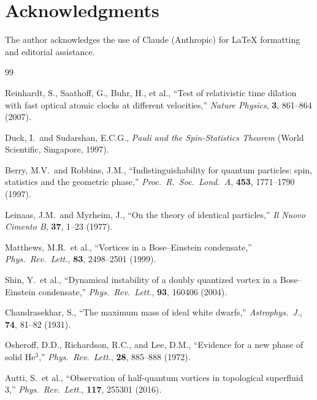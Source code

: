 ﻿\documentclass[12pt,letterpaper]{article}
\begin{document}

\section*{Acknowledgments}

The author acknowledges the use of Claude (Anthropic) for \LaTeX{} formatting
and editorial assistance.

\bigskip



\begin{thebibliography}{99}

Reinhardt, S., Saathoff, G., Buhr, H., et al.,
``Test of relativistic time dilation with fast optical atomic clocks at different velocities,''
\textit{Nature Physics}, \textbf{3}, 861--864 (2007).


Duck, I.\ and Sudarshan, E.C.G.,
\textit{Pauli and the Spin-Statistics Theorem}
(World Scientific, Singapore, 1997).


Berry, M.V.\ and Robbins, J.M.,
``Indistinguishability for quantum particles: spin, statistics and the geometric phase,''
\textit{Proc.\ R.\ Soc.\ Lond.\ A}, \textbf{453}, 1771--1790 (1997).


Leinaas, J.M.\ and Myrheim, J.,
``On the theory of identical particles,''
\textit{Il Nuovo Cimento B}, \textbf{37}, 1--23 (1977).


Matthews, M.R.\ et al.,
``Vortices in a Bose--Einstein condensate,''
\textit{Phys.\ Rev.\ Lett.}, \textbf{83}, 2498--2501 (1999).


Shin, Y.\ et al.,
``Dynamical instability of a doubly quantized vortex in a Bose--Einstein condensate,''
\textit{Phys.\ Rev.\ Lett.}, \textbf{93}, 160406 (2004).


Chandrasekhar, S.,
``The maximum mass of ideal white dwarfs,''
\textit{Astrophys.\ J.}, \textbf{74}, 81--82 (1931).


Osheroff, D.D., Richardson, R.C., and Lee, D.M.,
``Evidence for a new phase of solid He$^3$,''
\textit{Phys.\ Rev.\ Lett.}, \textbf{28}, 885--888 (1972).


Autti, S.\ et al.,
``Observation of half-quantum vortices in topological superfluid 3,''
\textit{Phys.\ Rev.\ Lett.}, \textbf{117}, 255301 (2016).




\end{thebibliography}
\end{document}
